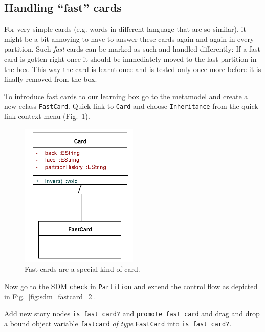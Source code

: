 \subsection{Handling ``fast'' cards}
	
For very simple cards (e.g. words in different language that are so similar), it
might be a bit annoying to have to answer these cards again and again in every
partition.  Such \emph{fast} cards can be marked as such and handled
differently:  If a fast card is gotten right once it should be immediately moved
to the last partition in the box.  This way the card is learnt once and is
tested only once more before it is finally removed from the box.

To introduce fast cards to our learning box go to the metamodel and create a new
eclass \texttt{FastCard}.  Quick link to \texttt{Card} and choose
\texttt{Inheritance} from the quick link context menu
(Fig.~\ref{fig:sdm_fastcard_1}). 

\begin{figure}[htp]
\begin{center}
  \includegraphics[width=0.5\textwidth]{pics/sdmBilder/bindings/fastcard}
  \caption{Fast cards are a special kind of card.}  
  \label{fig:sdm_fastcard_1}
\end{center}
\end{figure}

Now go to the SDM \texttt{check} in \texttt{Partition} and extend the control
flow as depicted in Fig.~\ref{fig:sdm_fastcard_2}. 
 
Add new story nodes
\texttt{is fast card?} and \texttt{promote fast card} and drag and drop a bound
object variable \texttt{fastcard} \emph{of type} \texttt{FastCard} into \texttt{is fast card?}.  

